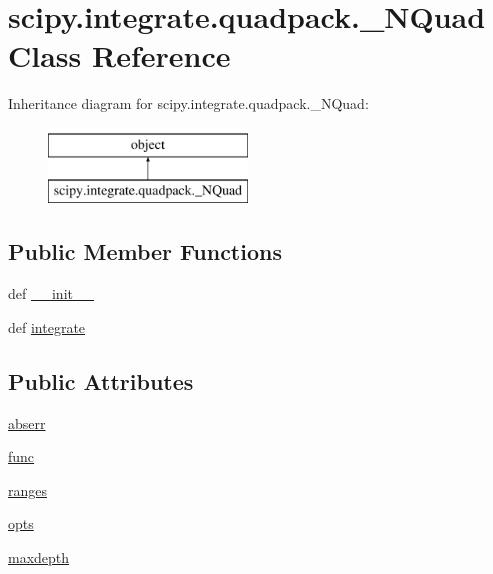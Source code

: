 \hypertarget{classscipy_1_1integrate_1_1quadpack_1_1__NQuad}{}\section{scipy.\+integrate.\+quadpack.\+\_\+\+N\+Quad Class Reference}
\label{classscipy_1_1integrate_1_1quadpack_1_1__NQuad}
Inheritance diagram for scipy.\+integrate.\+quadpack.\+\_\+\+N\+Quad\+:\begin{figure}[H]
\begin{center}
\leavevmode
\includegraphics[height=2.000000cm]{classscipy_1_1integrate_1_1quadpack_1_1__NQuad}
\end{center}
\end{figure}
\subsection*{Public Member Functions}
\begin{DoxyCompactItemize}
\item 
def \hyperlink{classscipy_1_1integrate_1_1quadpack_1_1__NQuad_aac23b9b155ddba6f07c17c42e7a3fe64}{\+\_\+\+\_\+init\+\_\+\+\_\+}
\item 
def \hyperlink{classscipy_1_1integrate_1_1quadpack_1_1__NQuad_aa43f92cddfa067eb5b00f3c11b8a7786}{integrate}
\end{DoxyCompactItemize}
\subsection*{Public Attributes}
\begin{DoxyCompactItemize}
\item 
\hyperlink{classscipy_1_1integrate_1_1quadpack_1_1__NQuad_ad33ff13082d6cedbd79111d35172cba8}{abserr}
\item 
\hyperlink{classscipy_1_1integrate_1_1quadpack_1_1__NQuad_abc7801338376415bbbee7f81df0ad02e}{func}
\item 
\hyperlink{classscipy_1_1integrate_1_1quadpack_1_1__NQuad_aa3fb7006a6d0c9e2ffc933ab1795a004}{ranges}
\item 
\hyperlink{classscipy_1_1integrate_1_1quadpack_1_1__NQuad_a8e88f1d511392624830349828c464a97}{opts}
\item 
\hyperlink{classscipy_1_1integrate_1_1quadpack_1_1__NQuad_a513f7698a6aadc40309f8a0932821874}{maxdepth}
\end{DoxyCompactItemize}


